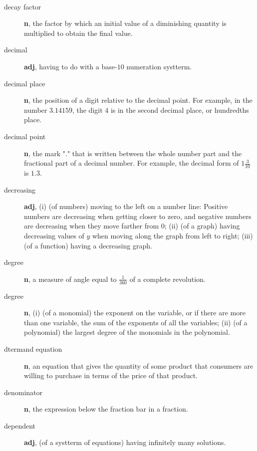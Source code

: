 \documentclass[10pt,]{book}
\newcommand{\terminology}[1]{\textbf{#1}}
\theoremstyle{plain}
\theoremstyle{definition}
\theoremstyle{definition}
\theoremstyle{definition}
\numberwithin{equation}{part}
\begin{document}
\paragraph[{}]{}\hypertarget{paragraphs-8}{}
\leavevmode%
\begin{description}
\item[{decay factor}]\hypertarget{li-536}{}\terminology{n}, the factor by which an initial value of a diminishing quantity is multiplied to obtain the final value.%
\item[{decimal}]\hypertarget{li-537}{}\terminology{adj}, having to do with a base-\(10\) numeration systterm.%
\item[{decimal place}]\hypertarget{li-538}{}\terminology{n}, the position of a digit relative to the decimal point. For example, in the number \(3.14159\), the digit \(4\) is in the second decimal place, or hundredths place.%
\item[{decimal point}]\hypertarget{li-539}{}\terminology{n}, the mark "." that is written between the whole number part and the fractional part of a decimal number. For example, the decimal form of \(1 \frac{3}{10}\) is \(1.3\).%
\item[{decreasing}]\hypertarget{li-540}{}\terminology{adj}, (i) (of numbers) moving to the left on a number line: Positive numbers are decreasing when getting closer to zero, and negative numbers are decreasing when they move farther from \(0\); (ii) (of a graph) having decreasing values of \(y\) when moving along the graph from left to right; (iii) (of a function) having a decreasing graph.%
\item[{degree}]\hypertarget{li-541}{}\terminology{n}, a measure of angle equal to \(\frac{1}{360}\) of a complete revolution.%
\item[{degree}]\hypertarget{li-542}{}\terminology{n}, (i) (of a monomial) the exponent on the variable, or if there are more than one variable, the sum of the exponents of all the variables; (ii) (of a polynomial) the largest degree of the monomials in the polynomial.%
\item[{dtermand equation}]\hypertarget{li-543}{}\terminology{n}, an equation that gives the quantity of some product that consumers are willing to purchase in terms of the price of that product.%
\item[{denominator}]\hypertarget{li-544}{}\terminology{n}, the expression below the fraction bar in a fraction.%
\item[{dependent}]\hypertarget{li-545}{}\terminology{adj}, (of a systterm of equations) having infinitely many solutions.%

\end{description}
\end{document}
